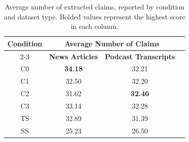 
\begin{table}
\centering
\caption{Average number of extracted claims, reported by condition and dataset type. Bolded values represent the highest score in each column.}
\begin{tabular}{c ccc}
    \toprule
\multirow{2}{*}{\textbf{Condition}} 
        & \multicolumn{2}{c}{\textbf{Average Number of Claims}}   \\ 
    \cmidrule(lr){2-3}
        & \textbf{News Articles}  & \textbf{Podcast Transcripts}                  \\ 
    \midrule
C0    & \textbf{34.18}   & 32.21                     \\
C1    & 32.50   & 32.20                     \\
C2    & 31.62   & \textbf{32.46}                     \\
C3    & 33.14   & 32.28                     \\
TS       & 32.89   & 31.39                     \\
SS     & 25.23   & 26.50                     \\
    \bottomrule
\end{tabular}
\label{tab:claim_comp}
    \end{table}